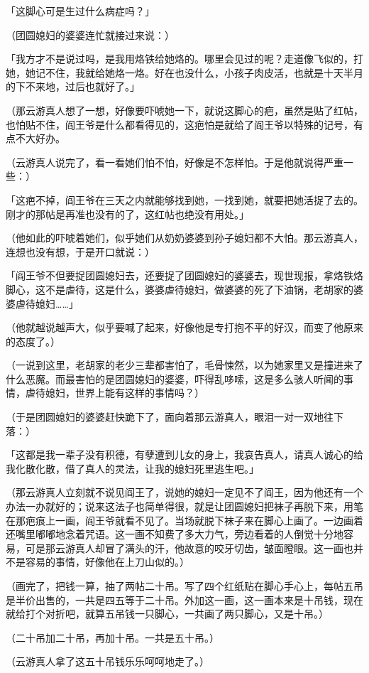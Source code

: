 \documentclass[UTF8]{ctexart}
\begin{document}
「这脚心可是生过什么病症吗？」

（团圆媳妇的婆婆连忙就接过来说：）

「我方才不是说过吗，是我用烙铁给她烙的。哪里会见过的呢？走道像飞似的，打她，她记不住，我就给她烙一烙。好在也没什么，小孩子肉皮活，也就是十天半月的下不来地，过后也就好了。」

（那云游真人想了一想，好像要吓唬她一下，就说这脚心的疤，虽然是贴了红帖，也怕贴不住，阎王爷是什么都看得见的，这疤怕是就给了阎王爷以特殊的记号，有点不大好办。

（云游真人说完了，看一看她们怕不怕，好像是不怎样怕。于是他就说得严重一些：）

「这疤不掉，阎王爷在三天之内就能够找到她，一找到她，就要把她活捉了去的。刚才的那帖是再准也没有的了，这红帖也绝没有用处。」

（他如此的吓唬着她们，似乎她们从奶奶婆婆到孙子媳妇都不大怕。那云游真人，连想也没有想，于是开口就说：）

「阎王爷不但要捉团圆媳妇去，还要捉了团圆媳妇的婆婆去，现世现报，拿烙铁烙脚心，这不是虐待，这是什么，婆婆虐待媳妇，做婆婆的死了下油锅，老胡家的婆婆虐待媳妇……」

（他就越说越声大，似乎要喊了起来，好像他是专打抱不平的好汉，而变了他原来的态度了。）

（一说到这里，老胡家的老少三辈都害怕了，毛骨悚然，以为她家里又是撞进来了什么恶魔。而最害怕的是团圆媳妇的婆婆，吓得乱哆嗦，这是多么骇人听闻的事情，虐待媳妇，世界上能有这样的事情吗？）

（于是团圆媳妇的婆婆赶快跪下了，面向着那云游真人，眼泪一对一双地往下落：）

「这都是我一辈子没有积德，有孽遭到儿女的身上，我哀告真人，请真人诚心的给我化散化散，借了真人的灵法，让我的媳妇死里逃生吧。」

（那云游真人立刻就不说见阎王了，说她的媳妇一定见不了阎王，因为他还有一个办法一办就好的；说来这法子也简单得很，就是让团圆媳妇把袜子再脱下来，用笔在那疤痕上一画，阎王爷就看不见了。当场就脱下袜子来在脚心上画了。一边画着还嘴里嘟嘟地念着咒语。这一画不知费了多大力气，旁边看着的人倒觉十分地容易，可是那云游真人却冒了满头的汗，他故意的咬牙切齿，皱面瞪眼。这一画也并不是容易的事情，好像他在上刀山似的。）

（画完了，把钱一算，抽了两帖二十吊。写了四个红纸贴在脚心手心上，每帖五吊是半价出售的，一共是四五等于二十吊。外加这一画，这一画本来是十吊钱，现在就给打个对折吧，就算五吊钱一只脚心，一共画了两只脚心，又是十吊。）

（二十吊加二十吊，再加十吊。一共是五十吊。）

（云游真人拿了这五十吊钱乐乐呵呵地走了。）
\end{document}
